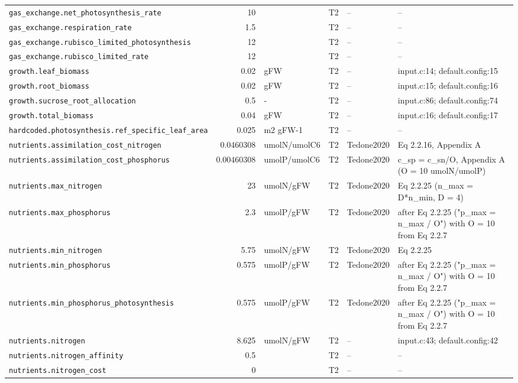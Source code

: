 \begin{table}[!htbp]
\begin{tabular}{@{}p{52mm}rp{20mm}cp{20mm}p{38mm}@{}}
\texttt{gas\_exchange.net\_photosynthesis\_rate} & 10 &  & T2 & -- & -- \\
\texttt{gas\_exchange.respiration\_rate} & 1.5 &  & T2 & -- & -- \\
\texttt{gas\_exchange.rubisco\_limited\_photosynthesis} & 12 &  & T2 & -- & -- \\
\texttt{gas\_exchange.rubisco\_limited\_rate} & 12 &  & T2 & -- & -- \\
\texttt{growth.leaf\_biomass} & 0.02 & gFW & T2 & -- & input.c:14; default.config:15 \\
\texttt{growth.root\_biomass} & 0.02 & gFW & T2 & -- & input.c:15; default.config:16 \\
\texttt{growth.sucrose\_root\_allocation} & 0.5 & - & T2 & -- & input.c:86; default.config:74 \\
\texttt{growth.total\_biomass} & 0.04 & gFW & T2 & -- & input.c:16; default.config:17 \\
\texttt{hardcoded.photosynthesis.ref\_specific\_leaf\_area} & 0.025 & m2 gFW-1 & T2 & -- & -- \\
\texttt{nutrients.assimilation\_cost\_nitrogen} & 0.0460308 & umolN/umolC6 & T2 & Tedone2020 & Eq 2.2.16, Appendix A \\
\texttt{nutrients.assimilation\_cost\_phosphorus} & 0.00460308 & umolP/umolC6 & T2 & Tedone2020 & c\_sp = c\_sn/O, Appendix A (O = 10 umolN/umolP) \\
\texttt{nutrients.max\_nitrogen} & 23 & umolN/gFW & T2 & Tedone2020 & Eq 2.2.25 (n\_max = D*n\_min, D = 4) \\
\texttt{nutrients.max\_phosphorus} & 2.3 & umolP/gFW & T2 & Tedone2020 & after Eq 2.2.25 ("p\_max = n\_max / O") with O = 10 from Eq 2.2.7 \\
\texttt{nutrients.min\_nitrogen} & 5.75 & umolN/gFW & T2 & Tedone2020 & Eq 2.2.25 \\
\texttt{nutrients.min\_phosphorus} & 0.575 & umolP/gFW & T2 & Tedone2020 & after Eq 2.2.25 ("p\_max = n\_max / O") with O = 10 from Eq 2.2.7 \\
\texttt{nutrients.min\_phosphorus\_photosynthesis} & 0.575 & umolP/gFW & T2 & Tedone2020 & after Eq 2.2.25 ("p\_max = n\_max / O") with O = 10 from Eq 2.2.7 \\
\texttt{nutrients.nitrogen} & 8.625 & umolN/gFW & T2 & -- & input.c:43; default.config:42 \\
\texttt{nutrients.nitrogen\_affinity} & 0.5 &  & T2 & -- & -- \\
\texttt{nutrients.nitrogen\_cost} & 0 &  & T2 & -- & -- \\

\end{tabular}
\end{table}

